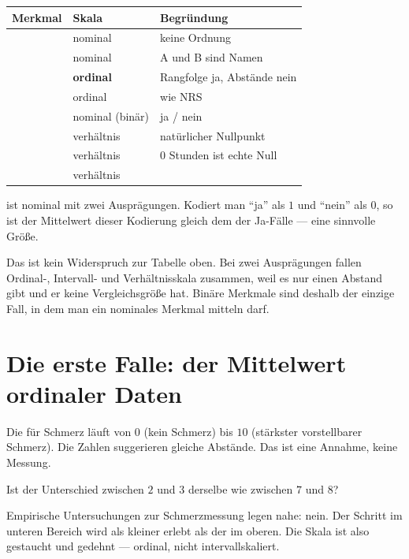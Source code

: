 \begin{merksatz}
\begin{center}
{\small
\renewcommand{\arraystretch}{1.45}
\begin{tabular}{@{}P{2.2cm}P{2.4cm}P{3.6cm}@{}}
\toprule
\textbf{Merkmal} & \textbf{Skala} & \textbf{Begründung}\\
\midrule
{} & nominal & keine Ordnung\\
 & nominal & A und B sind Namen\\
 & \textbf{ordinal} & Rangfolge ja, Abstände nein\\
 & ordinal & wie NRS\\
 & nominal (binär) & ja / nein\\
 & verhältnis & natürlicher Nullpunkt\\
 & verhältnis & $0$ Stunden ist echte Null\\
 & verhältnis & \\
\bottomrule
\end{tabular}}
\end{center}

 ist nominal mit zwei Ausprägungen. Kodiert man \enquote{ja} als $1$ und \enquote{nein} als $0$, so ist der Mittelwert dieser Kodierung gleich dem  der Ja-Fälle --- eine sinnvolle Größe.

Das ist kein Widerspruch zur Tabelle oben. Bei zwei Ausprägungen fallen Ordinal-, Intervall- und Verhältnisskala zusammen, weil es nur einen Abstand gibt und er keine Vergleichsgröße hat. Binäre Merkmale sind deshalb der einzige Fall, in dem man ein nominales Merkmal mitteln darf.
\end{merksatz}

\section{Die erste Falle: der Mittelwert ordinaler Daten}

\begin{warnung}
Die  für Schmerz läuft von $0$ (kein Schmerz) bis $10$ (stärkster vorstellbarer Schmerz). Die Zahlen suggerieren gleiche Abstände. Das ist eine Annahme, keine Messung.

Ist der Unterschied zwischen $2$ und $3$ derselbe wie zwischen $7$ und $8$?

Empirische Untersuchungen zur Schmerzmessung legen nahe: nein. Der Schritt im unteren Bereich wird als kleiner erlebt als der im oberen. Die Skala ist also gestaucht und gedehnt --- ordinal, nicht intervallskaliert.
\end{warnung}

